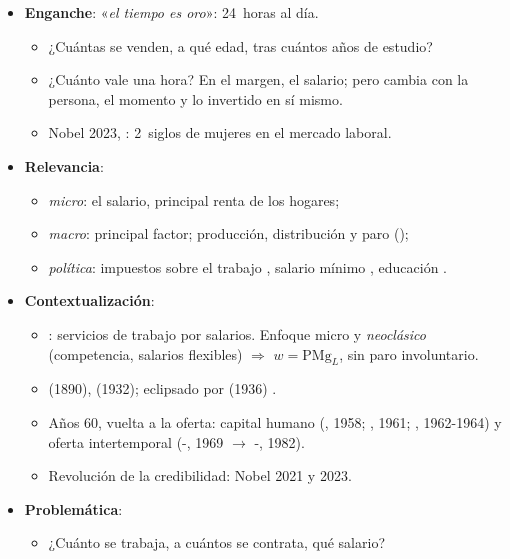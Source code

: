 \documentclass{article}
\begin{document}
\cabecerarepaso
\begin{columnas}

\begin{itemize}
\item \textbf{Enganche}: «\emph{el tiempo es oro}»: 24~horas al día.
  \begin{itemize}
  \item ¿Cuántas se venden, a qué edad, tras cuántos años de estudio?
  \item ¿Cuánto vale una hora? En el margen, el salario; pero cambia con la persona, el momento y lo invertido en sí mismo.
  \item Nobel 2023, : 2~siglos de mujeres en el mercado laboral.
  \end{itemize}
\item \textbf{Relevancia}:
  \begin{itemize}
  \item \emph{micro}: el salario, principal renta de los hogares;
  \item \emph{macro}: principal factor; producción, distribución y paro ();
  \item \emph{política}: impuestos sobre el trabajo , salario mínimo , educación .
  \end{itemize}
\item \textbf{Contextualización}:
  \begin{itemize}
  \item {}: servicios de trabajo por salarios. Enfoque micro y \emph{neoclásico} (competencia, salarios flexibles) $\Rightarrow$ $w=\mathrm{PMg}_L$, sin paro involuntario.
  \item {} (1890),  (1932); eclipsado por  (1936) .
  \item Años 60, vuelta a la oferta: capital humano (, 1958; , 1961; , 1962-1964) y oferta intertemporal (-, 1969 $\to$ -, 1982).
  \item Revolución de la credibilidad: Nobel 2021 y 2023.
  \end{itemize}
\item \textbf{Problemática}:
  \begin{itemize}
  \item ¿Cuánto se trabaja, a cuántos se contrata, qué salario?

\end{itemize}
\end{itemize}
\end{columnas}
\end{document}
